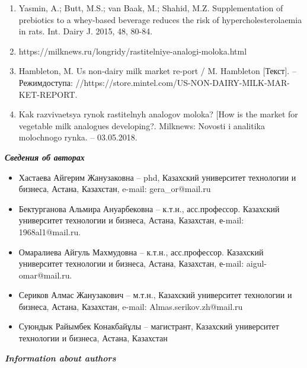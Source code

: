 \begin{enumerate}
\item
Yasmin, A.; Butt, M.S.; van Baak, M.; Shahid, M.Z. Supplementation of
prebiotics to a whey-based beverage reduces the risk of
hypercholesterolaemia in rats. Int. Dairy J. 2015, 48, 80-84.

\item
https://milknews.ru/longridy/rastitelniye-analogi-moloka.html

\item
Hambleton, M. Us non-dairy milk market re-port / M. Hambleton
{[}Текст{]}. -- Режимдоступа:
//https://store.mintel.com/US-NON-DAIRY-MILK-MAR-KET-REPORT.

\item
Kak razvivaetsya rynok rastitel\textquotesingle nyh analogov moloka?
{[}How is the market for vegetable milk analogues developing?. Milknews:
Novosti i analitika molochnogo rynka. -- 03.05.2018.
\end{enumerate}

\emph{{\bfseries Сведения об авторах}}

\begin{itemize}
\item
Хастаева Айгерим Жанузаковна -- phd, Казахский университет технологии и
бизнеса, Астана, Казахстан, e-mail: gera\_or@mail.ru

\item
Бектурганова Альмира Ануарбековна -- к.т.н., асс.профессор. Казахский
университет технологии и бизнеса, Астана, Казахстан, е-mail:
1968al1@mail.ru.

\item
Омаралиева Айгуль Махмудовна -- к.т.н., асс.профессор. Казахский
университет технологии и бизнеса, Астана, Казахстан, е-mail:
aigul-omar@mail.ru.

\item
Сериков Алмас Жанузакович -- м.т.н., Казахский университет технологии и
бизнеса, Астана, Казахстан, e-mail: Almas.serikov.zh@mail.ru

\item
Суюндык Райымбек Конакбайұлы -- магистрант, Казахский университет
технологии и бизнеса, Астана, Казахстан
\end{itemize}

\emph{{\bfseries Information about authors}}

